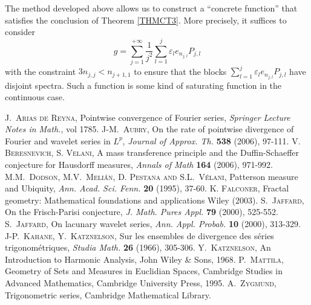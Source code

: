 \documentclass[11pt,a4paper]{amsart}
\theoremstyle{plain}
\begin{document}
\begin{remark}
The method developed above allows us to construct a 
``concrete function'' that satisfies the conclusion of Theorem \ref{THMCT3}. 
More precisely, it suffices to consider
$$g=\sum_{j=1}^{+\infty}\frac1{j^2}\sum_{l=1}^j{\varepsilon}_le_{n_{j,l}}P_{j,l}$$
with the constraint $3n_{j,j}<n_{j+1,1}$ to ensure that the blocks 
$\sum_{l=1}^j{\varepsilon}_le_{n_{j,l}}P_{j,l}$ have disjoint spectra. Such a function
is some kind of saturating function in the continuous case.
\end{remark}

\begin{thebibliography}{999}
\textsc{J.~Arias de Reyna,}
\newblock Pointwise convergence of Fourier series,
\newblock \emph{Springer Lecture Notes in Math.}, vol 1785.
\textsc{J-M.~Aubry,}
\newblock On the rate of pointwise divergence of Fourier and wavelet series in $L^p$,
\newblock \emph{Journal of Approx. Th.} \textbf{538} (2006), 97-111.
\textsc{V. Beresnevich, S. Velani,}
\newblock A mass transference principle and the Duffin-Schaeffer conjecture for Hausdorff measures,
\newblock \emph{Annals of Math} \textbf{164} (2006), 971-992.
\textsc{M.M.~Dodson, M.V.~Meli\'an, D. Pestana and S.L.~V\'elani,}
\newblock Patterson measure and Ubiquity,
\newblock \emph{Ann. Acad. Sci. Fenn.} \textbf{20} (1995), 37-60.  
\textsc{K. Falconer,}
\newblock Fractal geometry: Mathematical foundations and applications
\newblock Wiley (2003).
\textsc{S.~Jaffard,}
\newblock On the Frisch-Parisi conjecture,
\newblock \emph{J. Math. Pures Appl.} \textbf{79} (2000), 525-552. 
\textsc{S.~Jaffard,}
\newblock On lacunary wavelet series,
\newblock \emph{Ann. Appl. Probab.} \textbf{10} (2000), 313-329.
\textsc{J-P.~Kahane, Y.~Katznelson,}
\newblock Sur les ensembles de divergence des s\'eries trigonom\'etriques,
\newblock \emph{Studia Math.} \textbf{26} (1966), 305-306.
\textsc{Y.~Katznelson,}
\newblock An Introduction to Harmonic Analysis,
\newblock John Wiley \& Sons, 1968.
\textsc{P.~Mattila,}
\newblock Geometry of Sets and Measures in Euclidian Spaces,
\newblock Cambridge Studies
in Advanced Mathematics, Cambridge University Press, 1995.
\textsc{A.~Zygmund,}
\newblock Trigonometric series,
\newblock Cambridge Mathematical Library. 
\end{thebibliography}
\end{document}
